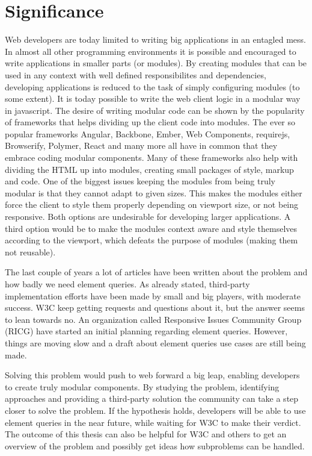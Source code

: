 \documentclass[oneside,a4paper,11pt]{kth-mag}
\begin{document}
\section*{Significance}
Web developers are today limited to writing big applications in an entagled mess. In almost all other programming environments it is possible and encouraged to write applications in smaller parts (or modules). By creating modules that can be used in any context with well defined responsibilites and dependencies, developing applications is reduced to the task of simply configuring modules (to some extent). It is today possible to write the web client logic in a modular way in javascript. The desire of writing modular code can be shown by the popularity of frameworks that helps dividing up the client code into modules. The ever so popular frameworks Angular, Backbone, Ember, Web Components, requirejs, Browserify, Polymer, React and many more all have in common that they embrace coding modular components. Many of these frameworks also help with dividing the HTML up into modules, creating small packages of style, markup and code. One of the biggest issues keeping the modules from being truly modular is that they cannot adapt to given sizes. This makes the modules either force the client to style them properly depending on viewport size, or not being responsive. Both options are undesirable for developing larger applications. A third option would be to make the modules context aware and style themselves according to the viewport, which defeats the purpose of modules (making them not reusable).

The last couple of years a lot of articles have been written about the problem and how badly we need element queries. As already stated, third-party implementation efforts have been made by small and big players, with moderate success. W3C keep getting requests and questions about it, but the answer seems to lean towards no. An organization called Responsive Issues Community Group (RICG) have started an initial planning regarding element queries. However, things are moving slow and a draft about element queries use cases are still being made.

Solving this problem would push to web forward a big leap, enabling developers to create truly modular components. By studying the problem, identifying approaches and providing a third-party solution the community can take a step closer to solve the problem. If the hypothesis holds, developers will be able to use element queries in the near future, while waiting for W3C to make their verdict. The outcome of this thesis can also be helpful for W3C and others to get an overview of the problem and possibly get ideas how subproblems can be handled.
\end{document}
